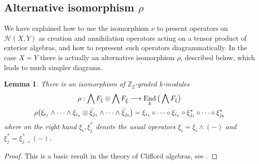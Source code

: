 \documentclass[english,letter paper,12pt,leqno]{article}
\newtheorem{lemma}[theorem]{Lemma}
\theoremstyle{example}
\newtheorem{remark}[theorem]{Remark}
\numberwithin{equation}{section}
\def\HH{\HH}
\def\HH{\mathcal{H}}
\def\nZ{\mathds{Z}}
\DeclareMathOperator{\End}{End}
\begin{document}

\subsection{Alternative isomorphism $\rho$}\label{section:altrho}

We have explained how to use the isomorphism $\nu$ to present operators on $\HH(X,Y)$ as creation and annihilation operators acting on a tensor product of exterior algebras, and how to represent such operators diagrammatically. In the case $X = Y$ there is actually an alternative isomorphism $\rho$, described below, which leads to much simpler diagrams.

\begin{lemma}\label{lemma:iso_rho} There is an isomorphism of $\nZ_2$-graded $k$-modules
\begin{gather*}
\rho: \bigwedge F_\xi \otimes \bigwedge F_{\Bar{\xi}} \lto \End_k\big( \bigwedge F_\xi \big)\\
\rho\big( \xi_{i_1} \wedge \cdots \wedge \xi_{i_a} \otimes \Bar{\xi}_{j_1} \wedge \cdots \wedge \Bar{\xi}_{j_b} \big) = \xi_{i_1} \circ \cdots \circ \xi_{i_a} \circ \xi_{j_1}^* \circ \cdots \circ \xi_{j_b}^*
\end{gather*}
where on the right hand $\xi_i, \xi_j^*$ denote the usual operators $\xi_i = \xi_i \wedge (-)$ and $\xi_j^* = \xi_j^* \lrcorner (-)$.
\end{lemma}
\begin{proof}
This is a basic result in the theory of Clifford algebras, see \cite{??}.
\end{proof}
\end{document}
